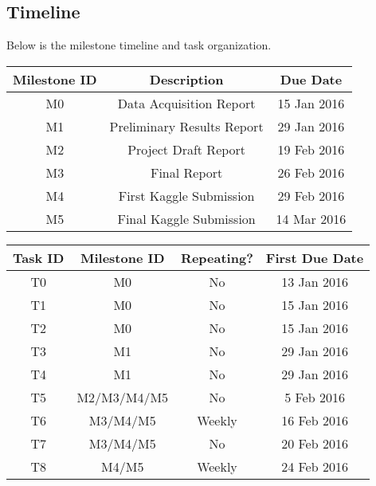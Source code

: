 \documentclass[12pt]{article}
\begin{document}
\subsection{Timeline}
Below is the milestone timeline and task organization.
\begin{center}
	\begin{tabular}{|c|c|c|}
		\hline
		Milestone ID & Description & Due Date \\
		\hline
		M0 & Data Acquisition Report & 15 Jan 2016 \\
		M1 & Preliminary Results Report & 29 Jan 2016 \\
		M2 & Project Draft Report & 19 Feb 2016 \\
		M3 & Final Report & 26 Feb 2016 \\
		M4 & First Kaggle Submission & 29 Feb 2016 \\
		M5 & Final Kaggle Submission & 14 Mar 2016 \\
		\hline
	\end{tabular}
\end{center}
\begin{center}
	\begin{tabular}{|c|c|c|c|}
		\hline
		Task ID & Milestone ID & Repeating? & First Due Date \\
		\hline
		T0 & M0 & No & 13 Jan 2016 \\
		T1 & M0 & No & 15 Jan 2016 \\
		T2 & M0 & No & 15 Jan 2016 \\
		T3 & M1 & No & 29 Jan 2016 \\
		T4 & M1 & No & 29 Jan 2016 \\
		T5 & M2/M3/M4/M5 & No & 5 Feb 2016 \\
		T6 & M3/M4/M5 & Weekly & 16 Feb 2016 \\
		T7 & M3/M4/M5 & No & 20 Feb 2016 \\
		T8 & M4/M5 & Weekly & 24 Feb 2016 \\
		\hline
	\end{tabular}
\end{center}
\end{document}
